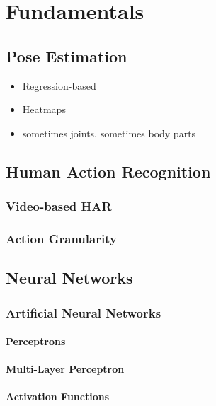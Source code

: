 \chapter{Fundamentals}

\section{Pose Estimation}
\begin{itemize}
    \item Regression-based
    \item Heatmaps
    \item sometimes joints, sometimes body parts
\end{itemize}

\section{Human Action Recognition}

\subsection{Video-based HAR}

\subsection{Action Granularity}

\section{Neural Networks}

\subsection{Artificial Neural Networks}
\subsubsection{Perceptrons}

\subsubsection{Multi-Layer Perceptron}

\subsubsection{Activation Functions}

